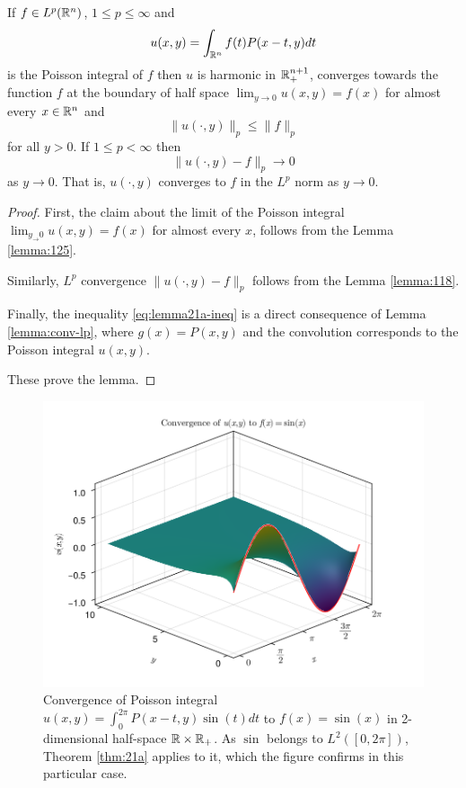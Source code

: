\begin{theorem}\label{thm:21a}
    If $f\in L^p(\mathbb R^n)$, $1\leq p\leq\infty$ and
    \begin{equation*}
        u(x,y)=\int_{\mathbb R^n}f(t)P(x-t,y)dt
    \end{equation*}
    is the Poisson integral of $f$ then $u$ is harmonic in $\mathbb R_+^{n+1}$, converges towards the function $f$ at the boundary of half space $\lim_{y\rightarrow0}u(x,y)=f(x)$ for almost every $x\in\mathbb R^n$ and
    \begin{equation}\label{eq:lemma21a-ineq}
        \|u(\cdot,y)\|_p\leq\|f\|_p
    \end{equation}
    for all $y>0$. If $1\leq p<\infty$ then
    \begin{equation*}
        \|u(\cdot,y)-f\|_p\rightarrow0
    \end{equation*}
    as $y\rightarrow0$. That is, $u(\cdot,y)$ converges to $f$ in the $L^p$ norm as $y\rightarrow0$.
\end{theorem}
\begin{proof}
    First, the claim about the limit of the Poisson integral $\lim_{y_\rightarrow0}u(x,y)=f(x)$ for almost every $x$, follows from the Lemma \ref{lemma:125}.

    Similarly, $L^p$ convergence $\|u(\cdot,y)-f\|_p$ follows from the Lemma \ref{lemma:118}.

    Finally, the inequality \ref{eq:lemma21a-ineq} is a direct consequence of Lemma \ref{lemma:conv-lp}, where $g(x)=P(x,y)$ and the convolution corresponds to the Poisson integral $u(x,y)$.

    These prove the lemma.
\end{proof}

\begin{figure}[h]\label{fig:convergence}
\centering
\includegraphics[width=\textwidth]{Figures/convergence.png}
\caption{Convergence of Poisson integral $u(x,y)=\int_0^{2\pi}P(x-t,y)\sin(t)dt$ to $f(x)=\sin(x)$ in 2-dimensional half-space $\mathbb R\times\mathbb R_+$. As $\sin$ belongs to $L^2([0,2\pi])$, Theorem \ref{thm:21a} applies to it, which the figure confirms in this particular case.}
\end{figure}

